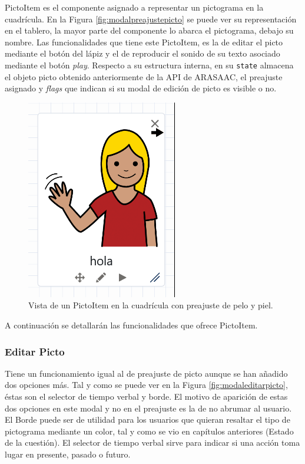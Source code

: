 PictoItem es el componente asignado a representar un pictograma en la cuadrícula. En la Figura \ref{fig:modalpreajustepicto} se puede ver su representación en el tablero, la mayor parte del componente lo abarca el pictograma, debajo su nombre. Las funcionalidades que tiene este PictoItem, es la de editar el picto mediante el botón del lápiz y el de reproducir el sonido de su texto asociado mediante el botón \textit{play}. Respecto a su estructura interna, en su \texttt{state} almacena el objeto picto obtenido anteriormente de la API de ARASAAC, el preajuste asignado y \textit{flags} que indican si su modal de edición de  picto es visible o no. 


\begin{figure}[h!]
	\centering
	\includegraphics[width=0.7\linewidth]{Imagenes/Bitmap/pictoItemModificado}
	\caption{Vista de un PictoItem en la cuadrícula con preajuste de pelo y piel. }
	\label{fig:pictoitemmodificado}
\end{figure}


A continuación se detallarán las funcionalidades que ofrece  PictoItem.


\subsubsection{Editar Picto}

Tiene un funcionamiento igual al de preajuste de picto aunque se han añadido dos opciones más. Tal y como se puede ver en la Figura \ref{fig:modaleditarpicto}, éstas son el selector de tiempo verbal y  borde. El motivo de aparición de estas dos opciones en este modal y no en el preajuste es la de no abrumar al usuario. El Borde puede ser de utilidad para los usuarios que quieran resaltar el tipo de pictograma mediante un color, tal y como se vio en capítulos anteriores (Estado de la cuestión). El selector de tiempo verbal sirve para indicar si una acción toma lugar en presente, pasado o futuro.


